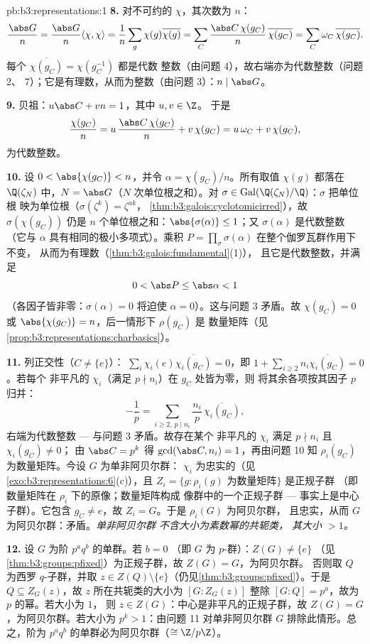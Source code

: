 \begin{solution}{pb:b3:representations:1}
\textbf{8.} 对不可约的 $\chi$，其次数为 $n$：
\[
\frac{\abs G}{n} = \frac{\abs G}{n}\langle\chi,\chi\rangle
= \frac1n \sum_{g}\chi(g)\overline{\chi(g)}
= \sum_{C}\frac{\abs C\,\chi(g_C)}{n}\,\overline{\chi(g_C)}
= \sum_C \omega_C\,\overline{\chi(g_C)} .
\]
每个 $\overline{\chi(g_C)} = \chi(g_C^{-1})$ 都是代数
整数（由问题 4），故右端亦为代数整数（问题 2、
7）；它是有理数，从而为整数（由问题 3）：$n \mid \abs
G$。

\textbf{9.} 贝祖：$u\abs C + vn = 1$，其中 $u, v \in \Z$。
于是
\[
\frac{\chi(g_C)}{n} = u\,\frac{\abs C\,\chi(g_C)}{n} +
v\,\chi(g_C) = u\,\omega_C + v\,\chi(g_C),
\]
为代数整数。

\textbf{10.} 设 $0 < \abs{\chi(g_C)} < n$，并令 $\alpha
= \chi(g_C)/n$。所有取值 $\chi(g)$ 都落在 $\Q(\zeta_N)$ 中，$N =
\abs G$（$N$ 次单位根之和）。对 $\sigma \in
\operatorname{Gal}(\Q(\zeta_N)/\Q)$：$\sigma$ 把单位根
映为单位根（$\sigma(\zeta^k) = \zeta^{ak}$，
\cref{thm:b3:galois:cyclotomicirred}），故 $\sigma(\chi(g_C))$
仍是 $n$ 个单位根之和：$\abs{\sigma(\alpha)}
\leq 1$；又 $\sigma(\alpha)$ 是代数整数（它与
$\alpha$ 具有相同的极小多项式）。乘积 $P =
\prod_\sigma \sigma(\alpha)$ 在整个伽罗瓦群作用下不变，
从而为有理数（\cref{thm:b3:galois:fundamental}(1)），
且它是代数整数，并满足
\[
0 < \abs P \leq \abs\alpha < 1
\]
（各因子皆非零：$\sigma(\alpha) = 0$ 将迫使 $\alpha =
0$）。这与问题 3 矛盾。故 $\chi(g_C) = 0$ 或
$\abs{\chi(g_C)} = n$，后一情形下 $\rho(g_C)$ 是
数量矩阵（见\cref{prop:b3:representations:charbasics}）。

\textbf{11.} 列正交性（$C \neq \{e\}$）：
$\sum_i \chi_i(e)\overline{\chi_i(g_C)} = 0$，即 $1 +
\sum_{i \geq 2} n_i\overline{\chi_i(g_C)} = 0$。若每个
非平凡的 $\chi_i$（满足 $p \nmid n_i$）在 $g_C$ 处皆为零，则
将其余各项按其因子 $p$ 归并：
\[
-\frac1p = \sum_{i \geq 2,\ p \mid n_i}
\frac{n_i}{p}\,\overline{\chi_i(g_C)},
\]
右端为代数整数 --- 与问题 3 矛盾。故存在某个
非平凡的 $\chi_i$ 满足 $p \nmid n_i$ 且 $\chi_i(g_C) \neq 0$；
由 $\abs C = p^k$ 得 $\gcd(\abs C, n_i) = 1$，再由问题 10
知 $\rho_i(g_C)$ 为数量矩阵。今设 $G$ 为单非阿贝尔群：
$\chi_i$ 为忠实的（见\cref{exo:b3:representations:6}(c)），且
$Z_i = \{g : \rho_i(g) \text{ 为数量矩阵}\}$ 是正规子群
（即数量矩阵在 $\rho_i$ 下的原像；数量矩阵构成
像群中的一个正规子群 --- 事实上是中心子群）。它包含
$g_C \neq e$，故 $Z_i = G$。于是 $\rho_i(G)$ 为阿贝尔群，
且忠实，从而 $G$ 为阿贝尔群：矛盾。\emph{单非阿贝尔群
不含大小为素数幂的共轭类，
其大小 $> 1$。}

\textbf{12.} 设 $G$ 为阶 $p^aq^b$ 的单群。若 $b = 0$
（即 $G$ 为 $p$-群）：$Z(G) \neq \{e\}$
（见\cref{thm:b3:groups:pfixed}）为正规子群，故 $Z(G) = G$，为阿贝尔群。
否则取 $Q$ 为西罗 $q$-子群，并取 $z \in Z(Q)
\setminus\{e\}$（仍见\cref{thm:b3:groups:pfixed}）。于是 $Q
\subseteq Z_G(z)$，故 $z$ 所在共轭类的大小为 $[G : Z_G(z)]$
整除 $[G : Q] = p^a$，故为 $p$ 的幂。若大小为 $1$，
则 $z \in Z(G)$：中心是非平凡的正规子群，故
$Z(G) = G$，为阿贝尔群。若大小为 $p^k > 1$：由问题 11
对单非阿贝尔群 $G$ 排除此情形。总之，阶为
$p^aq^b$ 的单群必为阿贝尔群（$\cong \Z/p\Z$）。


\end{solution}
